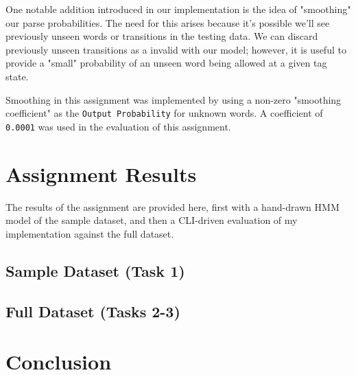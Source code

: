 \documentclass[11pt]{article}
\begin{document}
One notable addition introduced in our implementation is the idea of "smoothing"
our parse probabilities.  The need for this arises because it's possible we'll
see previously unseen words or transitions in the testing data.  We can discard
previously unseen transitions as a invalid with our model; however, it is useful
to provide a "small" probability of an unseen word being allowed at a given tag
state.

Smoothing in this assignment was implemented by using a non-zero "smoothing coefficient"
as the \texttt{Output Probability} for unknown words.  A coefficient of \texttt{0.0001} was used
in the evaluation of this assignment.


\section{Assignment Results}
The results of the assignment are provided here, first with a hand-drawn HMM model of the sample
dataset, and then a CLI-driven evaluation of my implementation against the full dataset.

\subsection{Sample Dataset (Task 1)}


\subsection{Full Dataset (Tasks 2-3)}


\section{Conclusion}
\end{document}
